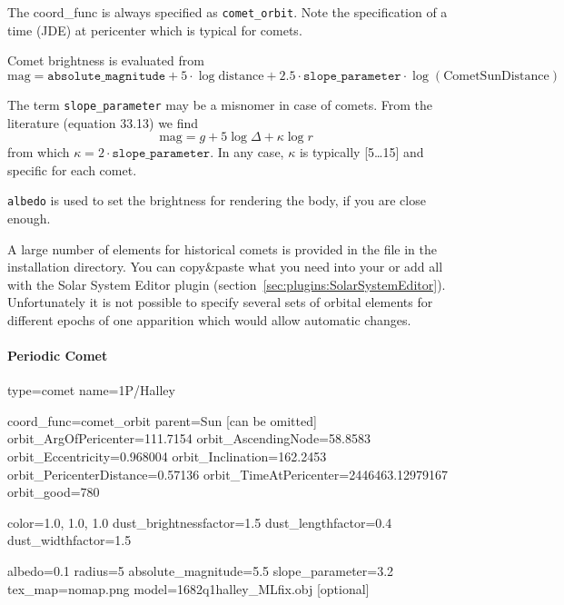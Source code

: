 The coord\_func is always specified as \texttt{comet\_orbit}.  Note the
specification of a time (JDE) at pericenter which is typical for
comets.

Comet brightness is evaluated from
\begin{equation}
  \label{eq:comet_magnitudes}
  \mathrm{mag}=\mathtt{absolute\_magnitude}+5\cdot\log{\mathrm{distance}} + 2.5\cdot\mathtt{slope\_parameter}\cdot\log(\mathrm{CometSunDistance})
\end{equation}

The term \texttt{slope\_parameter} may be a misnomer in case of
comets. From the literature \cite{AstronomicalAlgorithms:1998} (equation 33.13) we find
\begin{equation}
  \label{eq:comet_magnitudes_Meeus}
  \mathrm{mag}=g+5\log\Delta + \kappa\log r
\end{equation}
from which $\kappa=2\cdot\mathtt{slope\_parameter}$. In any case, $\kappa$ is typically [5\ldots15] and specific for each comet.

\texttt{albedo} is used to set the brightness for rendering the body,
if you are close enough. 

A large number of elements for historical comets is provided in the
file  in the installation directory. You
can copy\&paste what you need into your
 or add all with the Solar System Editor plugin (section~\ref{sec:plugins:SolarSystemEditor}). 
Unfortunately it is not possible to specify
several sets of orbital elements for different epochs of one apparition which would
allow automatic changes.

\paragraph{Periodic Comet}
\label{sec:ssystem.ini:Comet:Periodic}

\begin{configfile}
[1phalley]
type=comet  
name=1P/Halley

coord_func=comet_orbit
parent=Sun [can be omitted]
orbit_ArgOfPericenter=111.7154
orbit_AscendingNode=58.8583
orbit_Eccentricity=0.968004
orbit_Inclination=162.2453
orbit_PericenterDistance=0.57136
orbit_TimeAtPericenter=2446463.12979167
orbit_good=780

color=1.0, 1.0, 1.0
dust_brightnessfactor=1.5
dust_lengthfactor=0.4
dust_widthfactor=1.5

albedo=0.1
radius=5
absolute_magnitude=5.5
slope_parameter=3.2
tex_map=nomap.png
model=1682q1halley_MLfix.obj [optional]
\end{configfile}


